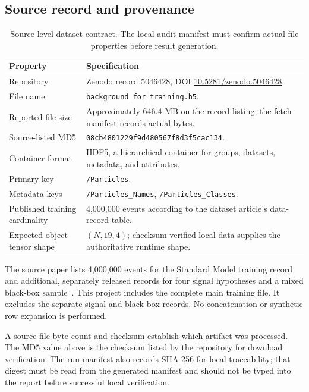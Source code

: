 \documentclass[11pt,a4paper]{article}
\begin{document}
\subsection{Source record and provenance}
\begin{table}[H]\centering
\caption{Source-level dataset contract. The local audit manifest must confirm actual file properties before result generation.}\label{tab:provenance}
\begin{tabularx}{\textwidth}{l X}\toprule
Property & Specification \\\midrule
Repository & Zenodo record 5046428, DOI \href{https://doi.org/10.5281/zenodo.5046428}{10.5281/zenodo.5046428}. \\
File name & \texttt{background\_for\_training.h5}. \\
Reported file size & Approximately 646.4 MB on the record listing; the fetch manifest records actual bytes. \\
Source-listed MD5 & \texttt{08cb4801229f9d480567f8d3f5cac134}. \\
Container format & HDF5, a hierarchical container for groups, datasets, metadata, and attributes. \\
Primary key & \texttt{/Particles}. \\
Metadata keys & \texttt{/Particles\_Names}, \texttt{/Particles\_Classes}. \\
Published training cardinality & 4,000,000 events according to the dataset article's data-record table. \\
Expected object tensor shape & \((N,19,4)\); checksum-verified local data supplies the authoritative runtime shape. \\\bottomrule
\end{tabularx}\end{table}

The source paper lists 4,000,000 events for the Standard Model training record and additional, separately released records for four signal hypotheses and a mixed black-box sample~\cite{govorkova2022lhc}. This project includes the complete main training file. It excludes the separate signal and black-box records. No concatenation or synthetic row expansion is performed.

A source-file byte count and checksum establish which artifact was processed. The MD5 value above is the checksum listed by the repository for download verification. The run manifest also records SHA-256 for local traceability; that digest must be read from the generated manifest and should not be typed into the report before successful local verification.
\end{document}
